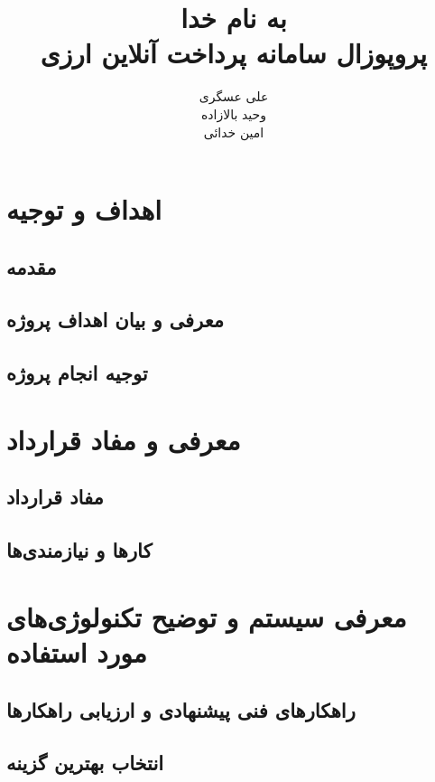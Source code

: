 \documentclass{article}
\title{به نام خدا\\پروپوزال سامانه پرداخت آنلاین ارزی}
\author{علی عسگری\\ وحید بالازاده \\ امین خدائی}
\begin{document}
\maketitle
\section{اهداف و توجیه}
\subsection{مقدمه}
\subsection{معرفی و بیان اهداف پروژه}
\subsection{توجیه انجام پروژه}
\section{معرفی و مفاد قرارداد}
\subsection{مفاد قرارداد}
\subsection{کارها و نیازمندی‌ها}
\section{معرفی سیستم و توضیح تکنولوژی‌های مورد استفاده}
\subsection{راهکارهای فنی پیشنهادی و ارزیابی راهکارها}

\subsection{انتخاب بهترین گزینه}
\end{document}

